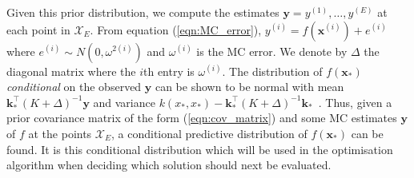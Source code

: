 \documentclass{article} %
\begin{document}
Given this prior distribution, we compute the estimates $\mathbf{y} = y^{(1)} , \ldots , y^{(E)}$ at each point in $\mathcal{X}_{E}$. From equation (\ref{eqn:MC_error}), $y^{(i)} = f(\textbf{x}^{(i)}) + e^{(i)}$ where $e^{(i)} \sim N(0, \omega^{2(i)})$ and $\omega^{(i)}$ is the MC error. We denote by $\Delta$ the diagonal matrix where the $i$th entry is $\omega^{(i)}$. The distribution of $f(\mathbf{x}_{*})$ \emph{conditional} on the observed $\mathbf{y}$ can be shown to be normal with mean $\mathbf{k}_{*}^\top(K + \Delta)^{-1}\mathbf{y}$ and variance $k(x_{*}, x_{*})-\mathbf{k}_{*}^\top(K + \Delta)^{-1}\mathbf{k}_{*}$~\cite{Rasmussen2006}. Thus, given a prior covariance matrix of the form (\ref{eqn:cov_matrix}) and some MC estimates $\mathbf{y}$ of $f$ at the points $\mathcal{X}_{E}$, a conditional predictive distribution of $f(\mathbf{x}_{*})$ can be found. It is this conditional distribution which will be used in the optimisation algorithm when deciding which solution should next be evaluated.

\end{document}
